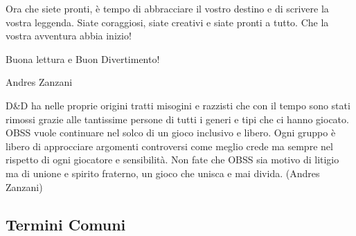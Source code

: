 \begin{multicols}{2}
Ora che siete pronti, è tempo di abbracciare il vostro destino e di scrivere la vostra leggenda. Siate coraggiosi, siate creativi e siate pronti a tutto. Che la vostra avventura abbia inizio!

\begin{center}
Buona lettura e Buon Divertimento!
\end{center}

\begin{flushright}
Andres Zanzani
\end{flushright}

\end{multicols}

\vfill

\begin{enfasi}
D\&D ha nelle proprie origini tratti misogini e razzisti che con il tempo sono stati rimossi grazie alle tantissime persone di tutti i generi e tipi che ci hanno giocato.
OBSS vuole continuare nel solco di un gioco inclusivo e libero. Ogni gruppo è libero di approcciare argomenti controversi come meglio crede ma sempre nel rispetto di ogni giocatore e sensibilità. Non fate che OBSS sia motivo di litigio ma di unione e spirito fraterno, un gioco che unisca e mai divida. (Andres Zanzani)
\end{enfasi}

\pagebreak

\subsection{Termini Comuni}\label{Termini Comuni}

